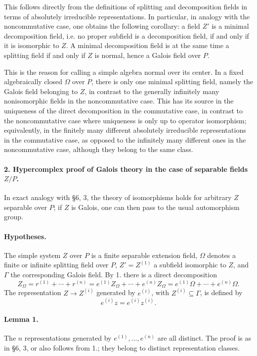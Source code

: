 \documentclass[11pt]{article}
\begin{document}
This follows directly from the definitions of splitting and decomposition fields in terms of absolutely irreducible representations. In particular, in analogy with the noncommutative case, one obtains the following corollary: a field \(Z'\) is a minimal decomposition field, i.e. no proper subfield is a decomposition field, if and only if it is isomorphic to \(Z\). A minimal decomposition field is at the same time a splitting field if and only if \(Z\) is normal, hence a Galois field over \(P\).

This is the reason for calling a simple algebra normal over its center. In a fixed algebraically closed \(\Omega\) over \(P\), there is only one minimal splitting field, namely the Galois field belonging to \(Z\), in contrast to the generally infinitely many nonisomorphic fields in the noncommutative case. This has its source in the uniqueness of the direct decomposition in the commutative case, in contrast to the noncommutative case where uniqueness is only up to operator isomorphism; equivalently, in the finitely many different absolutely irreducible representations in the commutative case, as opposed to the infinitely many different ones in the noncommutative case, although they belong to the same class.

\paragraph{2. Hypercomplex proof of Galois theory in the case of separable fields \(Z/P\).}
In exact analogy with §6, 3, the theory of isomorphisms holds for arbitrary \(Z\) separable over \(P\); if \(Z\) is Galois, one can then pass to the usual automorphism group.

\paragraph{Hypotheses.}
The simple system \(Z\) over \(P\) is a finite separable extension field, \(\Omega\) denotes a finite or infinite splitting field over \(P\), \(Z'=Z^{(1)}\) a subfield isomorphic to \(Z\), and \(\Gamma\) the corresponding Galois field. By 1. there is a direct decomposition
\[
        Z_\Omega=r^{(1)}+\cdots+r^{(n)}
        =e^{(1)}Z_\Omega+\cdots+e^{(n)}Z_\Omega
        =e^{(1)}\Omega+\cdots+e^{(n)}\Omega .
\]
The representation \(Z\to Z^{(i)}\) generated by \(e^{(i)}\), with \(Z^{(i)}\subseteq\Gamma\), is defined by
\[
        e^{(i)}z=e^{(i)}z^{(i)}.
\]

\paragraph{Lemma 1.}
The \(n\) representations generated by \(e^{(1)},\ldots,e^{(n)}\) are all distinct. The proof is as in §6, 3, or also follows from 1.; they belong to distinct representation classes.
\end{document}
